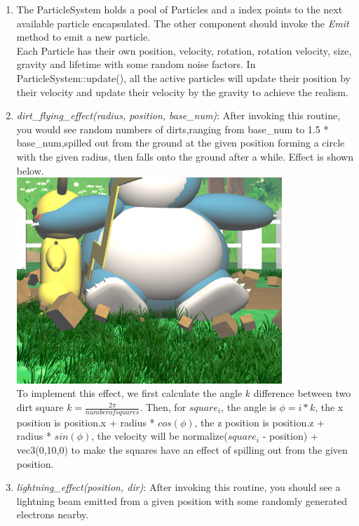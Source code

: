 \documentclass {article}
\begin{document}
\begin{enumerate}
    \item The ParticleSystem holds a pool of Particles and a index points to the next available particle encapsulated. The other component should invoke the \textit{Emit} method to emit a new particle. \\
    Each Particle has their own position, velocity, rotation, rotation velocity, size, gravity and lifetime with some random noise factors. In ParticleSystem::update(), all the active particles will update their position by their velocity and update
    their velocity by the gravity to achieve the realism.
    \item \textit{dirt\_flying\_effect(radius, position, base\_num)}: After invoking this routine, you would see random numbers of dirts,ranging from base\_num to 1.5 * base\_num,spilled out from the ground at the given position forming a circle with the given radius, then falls onto the ground after a while. Effect is shown below. \\
    \includegraphics[width=100mm]{flyingdirt.png} \\
    To implement this effect, we first calculate the angle $k$ difference between two dirt square $k = \frac{2\pi}{number of squares}$. Then, for $square_i$, the angle is $\phi = i * k$, the x position is position.x + radius * $cos(\phi)$, the z position is position.z + radius * $sin(\phi)$, the velocity will be
    normalize($square_i$ - position) + vec3(0,10,0) to make the squares have an effect of spilling out from the given position. 
    \item \textit{lightning\_effect(position, dir)}: After invoking this routine, you should see a lightning beam emitted from a given position with some randomly generated electrons nearby. \\

\end{enumerate}
\end{document}
